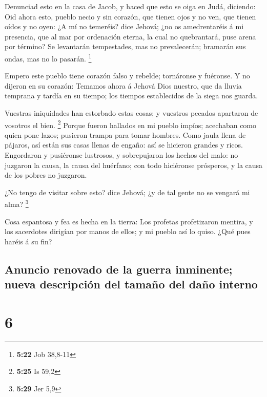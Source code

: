  Denunciad esto en la casa de Jacob, y haced que esto se
oiga en Judá, diciendo:  Oid ahora esto, pueblo necio y sin
corazón, que tienen ojos y no ven, que tienen oídos y no oyen:
 ¿A mí no temeréis? dice Jehová; ¿no os amedrentaréis á mi
presencia, que al mar por ordenación eterna, la cual no quebrantará,
puse arena por término? Se levantarán tempestades, mas no prevalecerán;
bramarán sus ondas, mas no lo pasarán. \footnote{\textbf{5:22} Job
  38,8-11}

 Empero este pueblo tiene corazón falso y rebelde;
tornáronse y fuéronse.  Y no dijeron en su corazón: Temamos
ahora á Jehová Dios nuestro, que da lluvia temprana y tardía en su
tiempo; los tiempos establecidos de la siega nos guarda.

 Vuestras iniquidades han estorbado estas cosas; y vuestros
pecados apartaron de vosotros el bien. \footnote{\textbf{5:25} Is 59,2}
 Porque fueron hallados en mi pueblo impíos; acechaban como
quien pone lazos; pusieron trampa para tomar hombres.  Como
jaula llena de pájaros, así están sus casas llenas de engaño: así se
hicieron grandes y ricos.  Engordaron y pusiéronse
lustrosos, y sobrepujaron los hechos del malo: no juzgaron la causa, la
causa del huérfano; con todo hiciéronse prósperos, y la causa de los
pobres no juzgaron.

 ¿No tengo de visitar sobre esto? dice Jehová; ¿y de tal
gente no se vengará mi alma? \footnote{\textbf{5:29} Jer 5,9}

 Cosa espantosa y fea es hecha en la tierra: 
Los profetas profetizaron mentira, y los sacerdotes dirigían por manos
de ellos; y mi pueblo así lo quiso. ¿Qué pues haréis á su fin?

\hypertarget{anuncio-renovado-de-la-guerra-inminente-nueva-descripciuxf3n-del-tamauxf1o-del-dauxf1o-interno}{%
\subsection{Anuncio renovado de la guerra inminente; nueva descripción
del tamaño del daño
interno}\label{anuncio-renovado-de-la-guerra-inminente-nueva-descripciuxf3n-del-tamauxf1o-del-dauxf1o-interno}}

\hypertarget{section-5}{%
\section{6}\label{section-5}}

